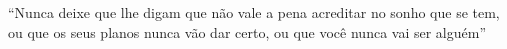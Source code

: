 ``Nunca deixe que lhe digam que não vale a pena
acreditar no sonho que se tem,
ou que os seus planos nunca vão dar certo,
ou que você nunca vai ser alguém''



